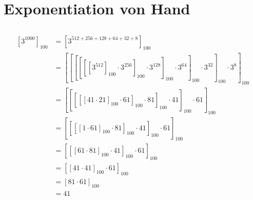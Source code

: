 \documentclass{../crypto}
\date{11. Dezember 2015}
\begin{document}
\maketitle

\section{Exponentiation von Hand}

\subsection{}
\begin{align*}
  \left[3^{1000}\right]_{100} &= \left[3^{512+256+128+64+32+8}\right]_{100} \\
                              &= \left[\left[\left[\left[\left[\left[3^{512}\right]_{100} 
                              \cdot 3^{256}\right]_{100}
                              \cdot 3^{128}\right]_{100}
                              \cdot 3^{64}\right]_{100}
                              \cdot 3^{32}\right]_{100}
                              \cdot 3^{8}\right]_{100} \\
                              &= \left[\left[\left[\left[\left[41 \cdot 21\right]_{100}
                              \cdot 61\right]_{100}
                              \cdot 81\right]_{100}
                              \cdot 41\right]_{100}
                              \cdot 61\right]_{100} \\
                              &= \left[\left[\left[\left[1 \cdot 61\right]_{100}
                              \cdot 81\right]_{100}
                              \cdot 41\right]_{100}
                              \cdot 61\right]_{100} \\
                              &= \left[\left[\left[61 \cdot 81\right]_{100}
                              \cdot 41\right]_{100}
                              \cdot 61\right]_{100} \\
                              &= \left[\left[41 \cdot 41\right]_{100}
                              \cdot 61\right]_{100} \\
                              &= \left[81 \cdot 61\right]_{100} \\
                              &= 41
\end{align*}
\end{document}

